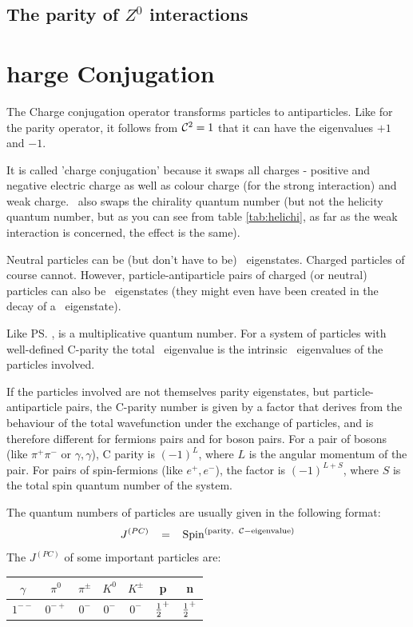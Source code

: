 \subsection{The parity of $Z^0$ interactions}



\section{\cs{}harge Conjugation}
\label{sec:ChargeConjugation}
 The Charge conjugation operator transforms particles to
 antiparticles. Like for the parity operator, it follows from $\mathcal{C}^2=1$
 that it can have the eigenvalues $+1$ and $-1$.

 It is called 'charge conjugation' because it swaps all charges -
 positive and negative electric charge as well as colour charge (for
 the strong interaction) and weak charge. \cs\ also swaps the
 chirality quantum number (but not the helicity quantum number, but as
 you can see from table \ref{tab:helichi}, as far as the weak
 interaction is concerned, the effect is the same).

 Neutral particles can be (but don't have to be) \cs\
 eigenstates. Charged particles of course cannot. However,
 particle-antiparticle pairs of charged (or neutral) particles can
 also be \cs\ eigenstates (they might even have been created in the
 decay of a \cs\ eigenstate).

 Like \ps, \cs is a multiplicative quantum number. For a system of
 particles with well-defined C-parity the total \cs\ eigenvalue is the
 intrinsic \cs\ eigenvalues of the particles involved. 

 If the particles involved are not themselves parity eigenstates, but
 particle-antiparticle pairs, the C-parity number is given by a factor
 that derives from the behaviour of the total wavefunction under the
 exchange of particles, and is therefore different for fermions pairs
 and for boson pairs. For a pair of bosons (like $\pi^+\pi^-$ or
 $\gamma, \gamma$), C parity is $(-1)^{L}$, where $L$ is the angular
 momentum of the pair. For pairs of spin-\half fermions (like $e^+,
 e^-$), the factor is $(-1)^{L+S}$, where $S$ is the total spin
 quantum number of the system.

 The quantum numbers of particles are usually given in the following
 format:
\begin{equation}
%
  J^{(PC)} \;\;\;= \;\;\;\mbox{Spin}^{(\mathrm{parity,\;\; \cs-eigenvalue})}
%
\end{equation}
 The $J^{(PC)}$ of some important particles are:\\
\begin{tabular}{|*{7}{c|}}
\hline
 $\gamma$ & $\pi^0$ & $\pi^{\pm}$ & $K^0$   & $K^{\pm}$ & p & n
\\\hline
 $1^{--}$ & $0^{-+}$& $0^{-}$     & $0^{-}$ & $0^{-}$   & $\frac{1}{2}^{+}$
 & $\frac{1}{2}^{+}$
\\
\hline
\end{tabular}

